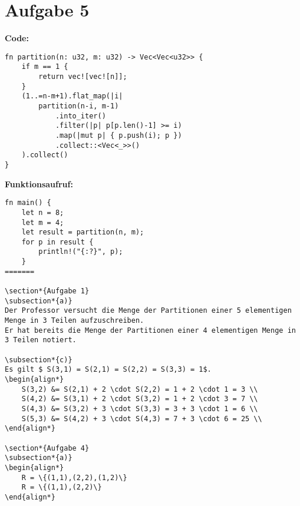 \documentclass[a4paper]{scrartcl}
\begin{document}
\newpage
\section*{Aufgabe 5}
\textbf{Code:}
\begin{lstlisting}
fn partition(n: u32, m: u32) -> Vec<Vec<u32>> {
    if m == 1 {
        return vec![vec![n]];
    }
    (1..=n-m+1).flat_map(|i| 
        partition(n-i, m-1)
            .into_iter()
            .filter(|p| p[p.len()-1] >= i)
            .map(|mut p| { p.push(i); p })
            .collect::<Vec<_>>()
    ).collect()
}
\end{lstlisting}
\textbf{Funktionsaufruf:}
\begin{lstlisting}
fn main() {
    let n = 8;
    let m = 4;
    let result = partition(n, m);
    for p in result {
        println!("{:?}", p);
    }
=======

\section*{Aufgabe 1}
\subsection*{a)}
Der Professor versucht die Menge der Partitionen einer 5 elementigen Menge in 3 Teilen aufzuschreiben.
Er hat bereits die Menge der Partitionen einer 4 elementigen Menge in 3 Teilen notiert.

\subsection*{c)}
Es gilt $ S(3,1) = S(2,1) = S(2,2) = S(3,3) = 1$.
\begin{align*}
    S(3,2) &= S(2,1) + 2 \cdot S(2,2) = 1 + 2 \cdot 1 = 3 \\
    S(4,2) &= S(3,1) + 2 \cdot S(3,2) = 1 + 2 \cdot 3 = 7 \\
    S(4,3) &= S(3,2) + 3 \cdot S(3,3) = 3 + 3 \cdot 1 = 6 \\
    S(5,3) &= S(4,2) + 3 \cdot S(4,3) = 7 + 3 \cdot 6 = 25 \\
\end{align*}

\section*{Aufgabe 4}
\subsection*{a)}
\begin{align*}
    R = \{(1,1),(2,2),(1,2)\}
    R = \{(1,1),(2,2)\}
\end{align*}


\end{lstlisting}
\end{document}
